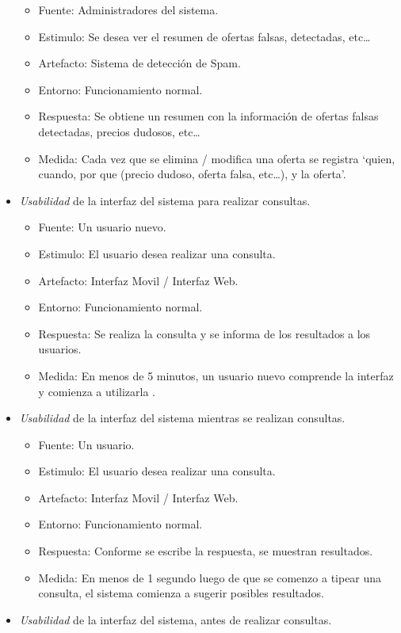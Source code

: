 \begin{itemize}
  \begin{itemize}
  \item
    Fuente: Administradores del sistema.
  \item
    Estimulo: Se desea ver el resumen de ofertas falsas, detectadas,
    etc\ldots{}
  \item
    Artefacto: Sistema de detección de Spam.
  \item
    Entorno: Funcionamiento normal.
  \item
    Respuesta: Se obtiene un resumen con la información de ofertas
    falsas detectadas, precios dudosos, etc\ldots{}
  \item
    Medida: Cada vez que se elimina / modifica una oferta se registra
    `quien, cuando, por que (precio dudoso, oferta falsa, etc\ldots{}),
    y la oferta'.
  \end{itemize}
\item
  \emph{Usabilidad} de la interfaz del sistema para realizar consultas.

  \begin{itemize}
  \item
    Fuente: Un usuario nuevo.
  \item
    Estimulo: El usuario desea realizar una consulta.
  \item
    Artefacto: Interfaz Movil / Interfaz Web.
  \item
    Entorno: Funcionamiento normal.
  \item
    Respuesta: Se realiza la consulta y se informa de los resultados a
    los usuarios.
  \item
    Medida: En menos de 5 minutos, un usuario nuevo comprende la
    interfaz y comienza a utilizarla .
  \end{itemize}
\item
  \emph{Usabilidad} de la interfaz del sistema mientras se realizan
  consultas.

  \begin{itemize}
  \item
    Fuente: Un usuario.
  \item
    Estimulo: El usuario desea realizar una consulta.
  \item
    Artefacto: Interfaz Movil / Interfaz Web.
  \item
    Entorno: Funcionamiento normal.
  \item
    Respuesta: Conforme se escribe la respuesta, se muestran resultados.
  \item
    Medida: En menos de 1 segundo luego de que se comenzo a tipear una
    consulta, el sistema comienza a sugerir posibles resultados.
  \end{itemize}
\item
  \emph{Usabilidad} de la interfaz del sistema, antes de realizar
  consultas.


\end{itemize}
